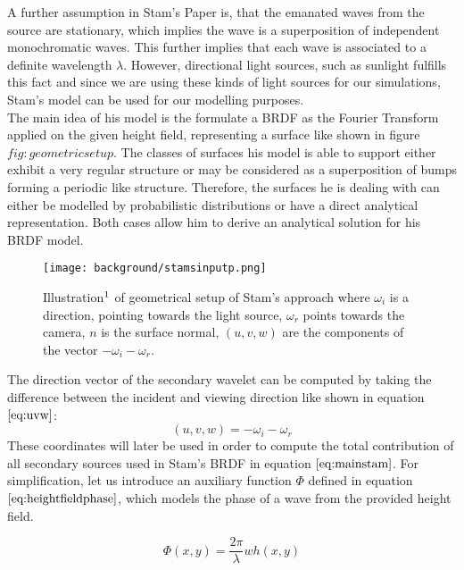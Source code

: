 A further assumption in Stam's Paper is, that the emanated waves from the source are stationary, which implies the wave is a superposition of independent monochromatic waves. This further implies that each wave is associated to a definite wavelength $\lambda$. However, directional light sources, such as sunlight fulfills this fact and since we are using these kinds of light sources for our simulations, Stam's model can be used for our modelling purposes. \\

The main idea of his model is the formulate a BRDF as the Fourier Transform applied on the given height field, representing a surface like shown in figure $fig:geometricsetup$. The classes of surfaces his model is able to support either exhibit a very regular structure or may be considered as a superposition of bumps forming a periodic like structure. Therefore, the surfaces he is dealing with can either be modelled by probabilistic distributions or have a direct analytical representation. Both cases allow him to derive an analytical solution for his BRDF model.

\begin{figure}[H]
  \centering
  \texttt{[image: background/stamsinputp.png]}
  \caption[Stam's geometrical setup]{Illustration$\footnotemark$ of geometrical setup of Stam's approach where $\omega_i$ is a direction, pointing towards the light source, $\omega_r$ points towards the camera, $n$ is the surface normal, $(u,v,w)$ are the components of the vector $-\omega_i - \omega_r$.}
  \label{fig:geometricsetup}  
\end{figure}

The direction vector of the secondary wavelet can be computed by taking the difference between the incident and viewing direction like shown in equation $\ref{eq:uvw}$:
\begin{equation}
  (u,v,w) = -\omega_i - \omega_r 
\label{eq:uvw}
\end{equation}
These coordinates will later be used in order to compute the total contribution of all secondary sources used in Stam's BRDF in equation $\ref{eq:mainstam}$. For simplification, let us introduce an auxiliary function $\Phi$ defined in equation $\ref{eq:heightfieldphase}$, which models the phase of a wave from the provided height field.

\begin{equation}
  \Phi(x,y) = \frac{2 \pi}{\lambda} w h(x,y) 
\label{eq:heightfieldphase}
\end{equation}

